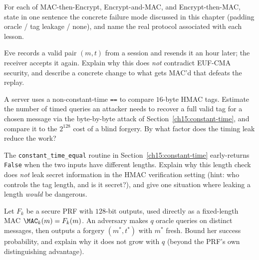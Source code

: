 \begin{exercise}
For each of MAC-then-Encrypt, Encrypt-and-MAC, and Encrypt-then-MAC, state in one sentence the concrete failure mode discussed in this chapter (padding oracle / tag leakage / none), and name the real protocol associated with each lesson.
\end{exercise}

\begin{exercise}
Eve records a valid pair $(m,t)$ from a session and resends it an hour later; the receiver accepts it again. Explain why this does \emph{not} contradict EUF-CMA security, and describe a concrete change to what gets MAC'd that defeats the replay.
\end{exercise}

\begin{exercise}
A server uses a non-constant-time \texttt{==} to compare $16$-byte HMAC tags. Estimate the number of timed queries an attacker needs to recover a full valid tag for a chosen message via the byte-by-byte attack of Section~\ref{ch15:constant-time}, and compare it to the $2^{128}$ cost of a blind forgery. By what factor does the timing leak reduce the work?
\end{exercise}

\begin{exercise}
The \texttt{constant\_time\_equal} routine in Section~\ref{ch15:constant-time} early-returns \texttt{False} when the two inputs have different lengths. Explain why this length check does \emph{not} leak secret information in the HMAC verification setting (hint: who controls the tag length, and is it secret?), and give one situation where leaking a length \emph{would} be dangerous.
\end{exercise}

\begin{exercise}
Let $F_k$ be a secure PRF with $128$-bit outputs, used directly as a fixed-length MAC $\MAC_k(m)=F_k(m)$. An adversary makes $q$ oracle queries on distinct messages, then outputs a forgery $(m^*,t^*)$ with $m^*$ fresh. Bound her success probability, and explain why it does not grow with $q$ (beyond the PRF's own distinguishing advantage).
\end{exercise}
